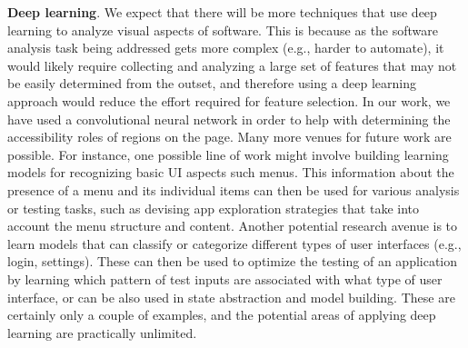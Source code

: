 {\textbf{Deep learning}.} 
We expect that there will be more techniques that use deep learning to analyze visual aspects of software. 
This is because as the software analysis task being addressed gets more complex (e.g., harder to automate), it would likely require collecting and analyzing 
a large set of features that may not be easily determined from the outset, and therefore using a deep learning approach would reduce the effort required for feature selection. 
In our work, we have used a convolutional neural network in order to help with determining the accessibility roles of regions on the page. 
Many more venues for future work are possible. 
For instance, one possible line of work might involve building learning models for recognizing basic UI aspects such menus.  
This information about the presence of a menu and its individual items can then be used for various analysis or testing tasks, such as devising app exploration  strategies that take into account the menu structure and content. Another potential research avenue is to learn models that can classify or categorize different types of user interfaces (e.g., login, settings). These can then be used to optimize the testing of an application by learning which pattern of test inputs are associated with what type of user interface, or can be also used in state abstraction and model building. These are certainly only a couple of examples, and the potential areas of applying deep learning are practically unlimited.  
 
